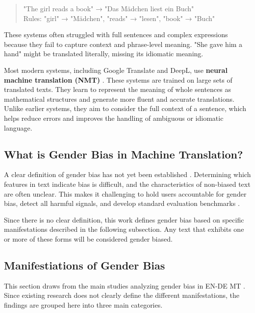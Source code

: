 \begin{quote}
"The girl reads a book" → "Das Mädchen liest ein Buch"\\[0.5em]
Rules: "girl" → "Mädchen", "reads" → "lesen", "book" → "Buch"
\end{quote}

\noindent These systems often struggled with full sentences and complex expressions because they fail to capture context and phrase-level meaning. "She gave him a hand" might be translated literally, missing its idiomatic meaning.

Most modern systems, including Google Translate and DeepL, use \textbf{neural machine translation (NMT)} \citep{wuGooglesNeuralMachine2016,deeplHowDoesDeepL2021}. These systems are trained on large sets of translated texts. They learn to represent the meaning of whole sentences as mathematical structures and generate more fluent and accurate translations. Unlike earlier systems, they aim to consider the full context of a sentence, which helps reduce errors and improves the handling of ambiguous or idiomatic language.


\subsection{What is Gender Bias in Machine Translation?}

A clear definition of gender bias has not yet been established \citep{stanczakSurveyGenderBias2021}. Determining which features in text indicate bias is difficult, and the characteristics of non-biased text are often unclear. This makes it challenging to hold users accountable for gender bias, detect all harmful signals, and develop standard evaluation benchmarks \citep{barclayInvestigatingMarkersDrivers2024a,shresthaExploringGenderBiases2022,stanczakSurveyGenderBias2021}. 

Since there is no clear definition, this work defines gender bias based on specific manifestations described in the following subsection. Any text that exhibits one or more of these forms will be considered gender biased.

\subsection{Manifestiations of Gender Bias}
This section draws from the main studies analyzing gender bias in EN-DE MT \citep{ullmannGenderBiasMachine2022,rescignoGenderBiasMachine2023,lardelliBuildingBridgesDataset2024,kapplAreAllSpanish2025}. Since existing research does not clearly define the different manifestations, the findings are grouped here into three main categories.

